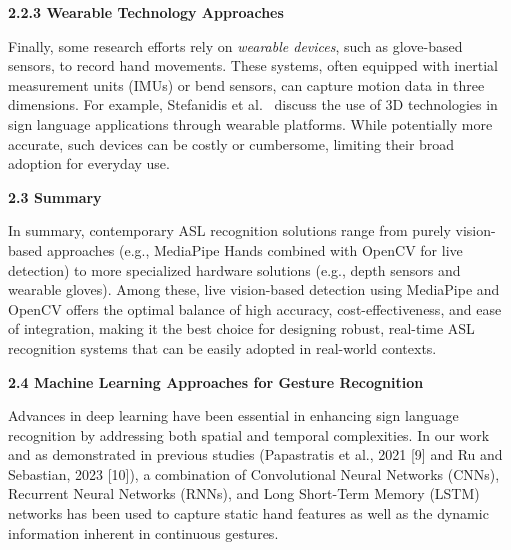 \documentclass[12pt]{article}
\begin{document}
\vspace{1.0em}
\noindent
\textbf{2.2.3 Wearable Technology Approaches}
\vspace{0.5em}

Finally, some research efforts rely on \textit{wearable devices}, such as glove-based sensors, to 
record hand movements. These systems, often equipped with inertial measurement units 
(IMUs) or bend sensors, can capture motion data in three dimensions. For example, 
Stefanidis et al.~\cite{ref5} discuss the use of 3D technologies in sign language applications 
through wearable platforms. While potentially more accurate, such devices can be costly or 
cumbersome, limiting their broad adoption for everyday use.

\vspace{1.5em}
\noindent
\textbf{2.3 Summary}
\vspace{1em}

In summary, contemporary ASL recognition solutions range from purely vision-based 
approaches (e.g., MediaPipe Hands combined with OpenCV for live detection) to more 
specialized hardware solutions (e.g., depth sensors and wearable gloves). Among these, live 
vision-based detection using MediaPipe and OpenCV offers the optimal balance of high 
accuracy, cost-effectiveness, and ease of integration, making it the best choice for designing 
robust, real-time ASL recognition systems that can be easily adopted in real-world contexts.


\vspace{1.5em}
\noindent
\textbf{2.4 Machine Learning Approaches for Gesture Recognition}
\vspace{1em}

Advances in deep learning have been essential in enhancing sign language recognition 
by addressing both spatial and temporal complexities. In our work and as demonstrated in 
previous studies (Papastratis et al., 2021 [9] and Ru and Sebastian, 2023 [10]), a combination 
of Convolutional Neural Networks (CNNs), Recurrent Neural Networks (RNNs), and Long 
Short-Term Memory (LSTM) networks has been used to capture static hand features as well 
as the dynamic information inherent in continuous gestures.
\end{document}

